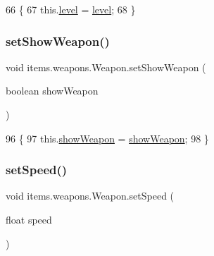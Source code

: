 \begin{DoxyCode}
66                                     \{
67         this.\mbox{\hyperlink{classitems_1_1weapons_1_1_weapon_ae66ceb47ad12380ee5d39960606980b3}{level}} = \mbox{\hyperlink{classitems_1_1weapons_1_1_weapon_ae66ceb47ad12380ee5d39960606980b3}{level}};
68     \}
\end{DoxyCode}
\mbox{\label{classitems_1_1weapons_1_1_weapon_ac7a2a2577ee56bd6646dbae61beae819}} 
\subsubsection{\texorpdfstring{set\+Show\+Weapon()}{setShowWeapon()}}
{\footnotesize\ttfamily void items.\+weapons.\+Weapon.\+set\+Show\+Weapon (\begin{DoxyParamCaption}\item[{boolean}]{show\+Weapon }\end{DoxyParamCaption})\hspace{0.3cm}{\ttfamily [inline]}}


\begin{DoxyCode}
96                                                   \{
97         this.\mbox{\hyperlink{classitems_1_1weapons_1_1_weapon_a10d11b88c4ef35bf42543658c6d7e675}{showWeapon}} = \mbox{\hyperlink{classitems_1_1weapons_1_1_weapon_a10d11b88c4ef35bf42543658c6d7e675}{showWeapon}};
98     \}
\end{DoxyCode}
\mbox{\label{classitems_1_1weapons_1_1_weapon_a5e46a5b3555de5a67d259546156928e3}} 
\subsubsection{\texorpdfstring{set\+Speed()}{setSpeed()}}
{\footnotesize\ttfamily void items.\+weapons.\+Weapon.\+set\+Speed (\begin{DoxyParamCaption}\item[{float}]{speed }\end{DoxyParamCaption})\hspace{0.3cm}{\ttfamily [inline]}}


